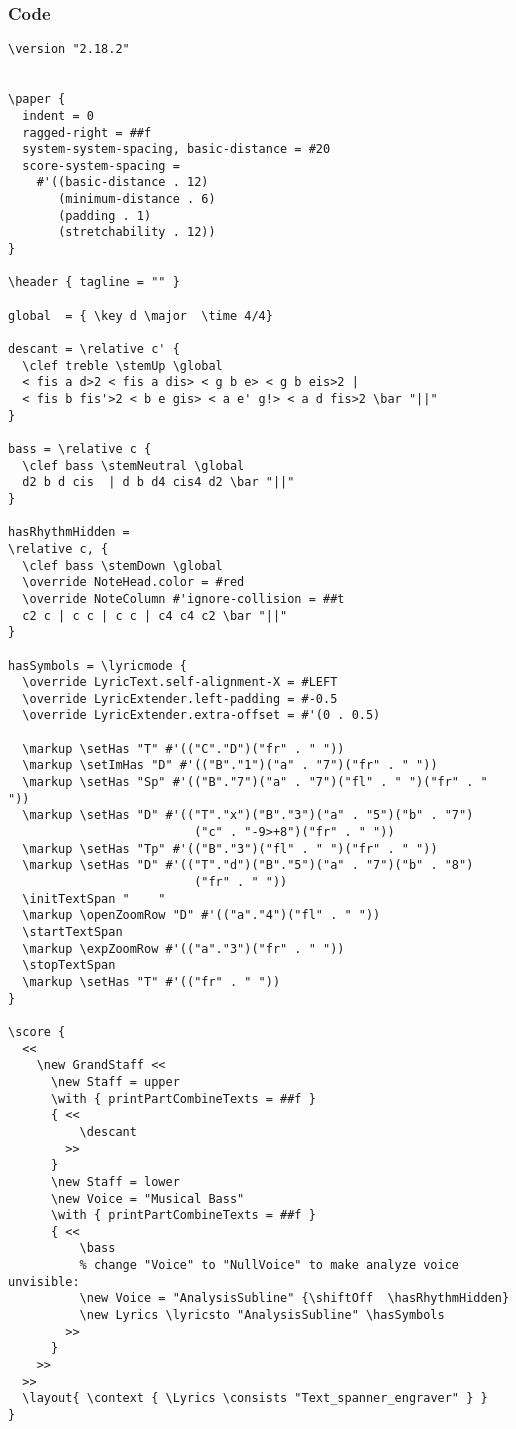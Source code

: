 \documentclass[
  DIV=calc,
  BCOR=5mm,
  12pt,
  headings=small,
  oneside,
  abstract=true,
  toc=bib,
  xcolor=dvipsnames,
  openany,
  english]{scrartcl}
\begin{document}
\subsubsection{Code}
\begin{scriptsize}
\begin{verbatim}
\version "2.18.2"


\paper {
  indent = 0
  ragged-right = ##f
  system-system-spacing, basic-distance = #20
  score-system-spacing =
    #'((basic-distance . 12)
       (minimum-distance . 6)
       (padding . 1)
       (stretchability . 12))
}

\header { tagline = "" }

global  = { \key d \major  \time 4/4}

descant = \relative c' {
  \clef treble \stemUp \global
  < fis a d>2 < fis a dis> < g b e> < g b eis>2 |
  < fis b fis'>2 < b e gis> < a e' g!> < a d fis>2 \bar "||"
}

bass = \relative c {
  \clef bass \stemNeutral \global
  d2 b d cis  | d b d4 cis4 d2 \bar "||"
}

hasRhythmHidden =
\relative c, {
  \clef bass \stemDown \global
  \override NoteHead.color = #red
  \override NoteColumn #'ignore-collision = ##t
  c2 c | c c | c c | c4 c4 c2 \bar "||"
}

hasSymbols = \lyricmode {
  \override LyricText.self-alignment-X = #LEFT
  \override LyricExtender.left-padding = #-0.5
  \override LyricExtender.extra-offset = #'(0 . 0.5)

  \markup \setHas "T" #'(("C"."D")("fr" . " "))
  \markup \setImHas "D" #'(("B"."1")("a" . "7")("fr" . " "))
  \markup \setHas "Sp" #'(("B"."7")("a" . "7")("fl" . " ")("fr" . " "))
  \markup \setHas "D" #'(("T"."x")("B"."3")("a" . "5")("b" . "7")
                          ("c" . "-9>+8")("fr" . " "))
  \markup \setHas "Tp" #'(("B"."3")("fl" . " ")("fr" . " "))
  \markup \setHas "D" #'(("T"."d")("B"."5")("a" . "7")("b" . "8")
                          ("fr" . " "))
  \initTextSpan "    "
  \markup \openZoomRow "D" #'(("a"."4")("fl" . " "))
  \startTextSpan
  \markup \expZoomRow #'(("a"."3")("fr" . " "))
  \stopTextSpan
  \markup \setHas "T" #'(("fr" . " "))
}

\score {
  <<
    \new GrandStaff <<
      \new Staff = upper
      \with { printPartCombineTexts = ##f }
      { <<
          \descant
        >>
      }
      \new Staff = lower
      \new Voice = "Musical Bass"
      \with { printPartCombineTexts = ##f }
      { <<
          \bass
          % change "Voice" to "NullVoice" to make analyze voice unvisible:
          \new Voice = "AnalysisSubline" {\shiftOff  \hasRhythmHidden}
          \new Lyrics \lyricsto "AnalysisSubline" \hasSymbols
        >>
      }
    >>
  >>
  \layout{ \context { \Lyrics \consists "Text_spanner_engraver" } }
}
\end{verbatim}
\end{scriptsize}
\end{document}
